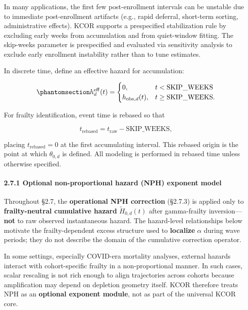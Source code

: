 \documentclass[
]{article}
\begin{document}
In many applications, the first few post-enrollment intervals can be unstable due to immediate post-enrollment artifacts (e.g., rapid deferral, short-term sorting, administrative effects). KCOR supports a prespecified stabilization rule by excluding early weeks from accumulation and from quiet-window fitting. The skip-weeks parameter is prespecified and evaluated via sensitivity analysis to exclude early enrollment instability rather than to tune estimates.

In discrete time, define an effective hazard for accumulation:

\begin{equation}\protect\phantomsection\label{eq:effective-hazard-skip}{h_d^{\mathrm{eff}}(t)=
\begin{cases}
0, & t < \mathrm{SKIP\_WEEKS} \\
h_{\mathrm{obs},d}(t), & t \ge \mathrm{SKIP\_WEEKS}.
\end{cases}}\end{equation}

For frailty identification, event time is rebased so that

\[t_{\mathrm{rebased}} = t_{\mathrm{raw}} - \mathrm{SKIP\_WEEKS},\]

placing \(t_{\mathrm{rebased}}=0\) at the first accumulating interval. This rebased origin is the point at which \(\theta_{0,d}\) is defined. All modeling is performed in rebased time unless otherwise specified.

\paragraph{2.7.1 Optional non-proportional hazard (NPH) exponent model}\label{optional-non-proportional-hazard-nph-exponent-model}

Throughout §2.7, the \textbf{operational NPH correction} (§2.7.3) is applied only to \textbf{frailty-neutral cumulative hazard} \(\tilde H_{0,d}(t)\) after gamma-frailty inversion---\textbf{not} to raw observed instantaneous hazard. The hazard-level relationships below motivate the frailty-dependent excess structure used to \textbf{localize} \(\alpha\) during wave periods; they do not describe the domain of the cumulative correction operator.

In some settings, especially COVID-era mortality analyses, external hazards interact with cohort-specific frailty in a non-proportional manner. In such cases, scalar rescaling is not rich enough to align trajectories across cohorts because amplification may depend on depletion geometry itself. KCOR therefore treats NPH as an \textbf{optional exponent module}, not as part of the universal KCOR core.
\end{document}

